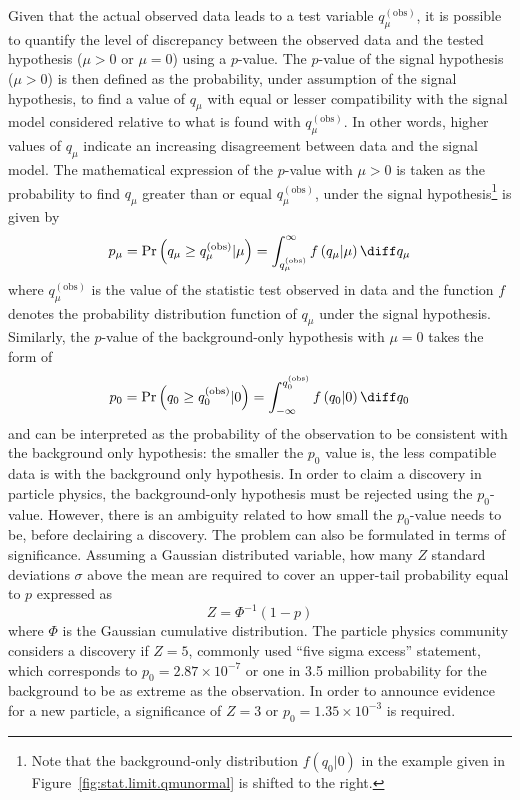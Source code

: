 Given that the actual observed data leads to a test variable $q_{\mu}^{\left(\text{obs}\right)}$, it is possible to 
quantify the level of discrepancy between the observed data and the tested hypothesis ($\mu>0$ or $\mu=0$) using 
a $p$-value. 
The $p$-value of the signal hypothesis ($\mu>0$) is then defined as the probability, under assumption of the signal hypothesis, 
to find a value of $q_{\mu}$ with equal or lesser compatibility with the signal model considered relative to what is 
found with $q_{\mu}^{\left(\text{obs}\right)}$. In other words,  higher values of $q_{\mu}$ indicate an increasing disagreement
between data and the signal model. The mathematical expression of the $p$-value with $\mu>0$ is taken as the probability 
to find $q_{\mu}$ greater than or equal $q_{\mu}^{\left(\text{obs}\right)}$, under the signal hypothesis\footnote{Note that 
 the background-only distribution $f\left(q_{0} \rvert 0\right)$ in the example given in 
Figure~\ref{fig:stat.limit.qmunormal} is shifted to the right.} is given by
\begin{equation}
p_{\mu} = \Pr\left(q_{\mu} \geq q_{\mu}^{\left(\text{obs}\right)} \rvert \mu \right) = \int_{q_{\mu}^{\left(\text{obs}\right)}}^{\infty} f\left(q_{\mu} \rvert \mu\right) \diff q_{\mu}
\end{equation}
where $q_{\mu}^{\left(\text{obs}\right)}$ is the value of the statistic test observed in data and the function $f$
denotes the probability distribution function of $q_{\mu}$ under the signal hypothesis. 
Similarly, the $p$-value of the background-only hypothesis with $\mu=0$ takes the form of 
\begin{equation}
p_{0} = \Pr\left(q_{0} \geq q_{0}^{\left(\text{obs}\right)} \rvert 0 \right) = \int^{q_{0}^{\left(\text{obs}\right)}}_{-\infty} f\left(q_{0} \rvert 0\right) \diff q_{0}
\end{equation}
and can be interpreted as the probability of the observation to be consistent with the background only hypothesis:
the smaller the $p_{0}$ value is, the less compatible data is with the background only hypothesis. 
In order to claim a discovery in particle physics, 
the background-only hypothesis must be rejected using the $p_0$-value. 
However, there is an ambiguity related to how small the $p_0$-value needs to 
be, before declairing a discovery. 
The problem can also be formulated in terms of significance.
Assuming a Gaussian distributed variable, how many $Z$ standard deviations 
$\sigma$ above the mean are required to cover an upper-tail probability equal 
to $p$ expressed as 
\begin{equation}
Z = \Phi^{-1}\left(1-p\right)
\end{equation}
 where $\Phi$ is the Gaussian cumulative distribution.
The particle physics community considers a discovery if $Z=5$, commonly 
used ``five sigma excess'' statement, which corresponds to 
$p_0 = 2.87\times 10^{-7}$ or one in 3.5 million probability for the background
 to be as extreme as the observation. In order to announce evidence for a 
new particle, a significance of $Z=3$ or $p_0 = 1.35\times 10^{-3}$ is required.


